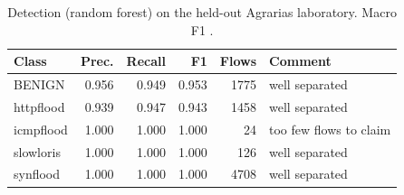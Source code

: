 \begin{table}[t]
\centering
\small
\caption{Detection (random forest) on the held-out Agrarias laboratory. Macro F1 \Fmacro.}
\label{tbl:deteccion}
\begin{tabular}{@{}lrrrrp{2.4cm}@{}}
\toprule
Class & Prec. & Recall & F1 & Flows & Comment \\
\midrule
BENIGN & 0.956 & 0.949 & 0.953 & 1775 & well separated \\
httpflood & 0.939 & 0.947 & 0.943 & 1458 & well separated \\
icmpflood & 1.000 & 1.000 & 1.000 & 24 & too few flows to claim \\
slowloris & 1.000 & 1.000 & 1.000 & 126 & well separated \\
synflood & 1.000 & 1.000 & 1.000 & 4708 & well separated \\
\bottomrule
\end{tabular}
\end{table}
